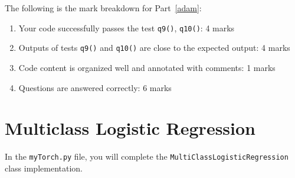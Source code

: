 \documentclass{article}
\theoremstyle{definition}
\begin{document}
The following is the mark breakdown for Part~\ref{adam}:
\begin{enumerate}[label=(\roman*)]
	\item Your code successfully passes the test \verb|q9()|, \verb|q10()|: 4 marks
	\item Outputs of tests \verb|q9()| and \verb|q10()| are close to the expected output: 4 marks
	\item Code content is organized well and annotated with comments: 1 marks
	\item Questions are answered correctly: 6 marks
\end{enumerate}
\pagebreak
\section{Multiclass Logistic Regression}\label{logis}

In the \verb|myTorch.py| file, you will complete the \verb|MultiClassLogisticRegression| class implementation. 
\end{document}
